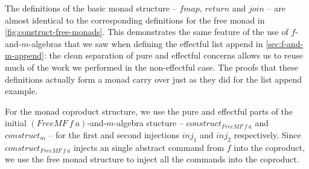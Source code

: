 \documentclass{jfp1}
\begin{document}
The definitions of the basic monad structure -- $\mathit{fmap}$,
$\mathit{return}$ and $\mathit{join}$ -- are almost identical to the
corresponding definitions for the free monad in
\autoref{fig:construct-free-monads}. This demonstrates the same
feature of the use of $f$-and-$m$-algebras that we saw when defining
the effectful list append in \autoref{sec:f-and-m-append}: the clean
separation of pure and effectful concerns allows us to reuse much of
the work we performed in the non-effectful case. The proofs that these
definitions actually form a monad carry over just as they did for the
list append example.

For the monad coproduct structure, we use the pure and effectful parts
of the initial $(\mathit{FreeMF}~f~a)$-and-$m$-algebra stucture --
$\mathit{construct}_{\mathit{FreeMF}~f~a}$ and $\mathit{construct}_m$
-- for the first and second injections $\mathit{inj}_1$ and
$\mathit{inj}_2$ respectively. Since
$\mathit{construct}_{\mathit{FreeMF}~f~a}$ injects an single abstract
command from $f$ into the coproduct, we use the free monad structure
to inject all the commands into the coproduct.
\end{document}
